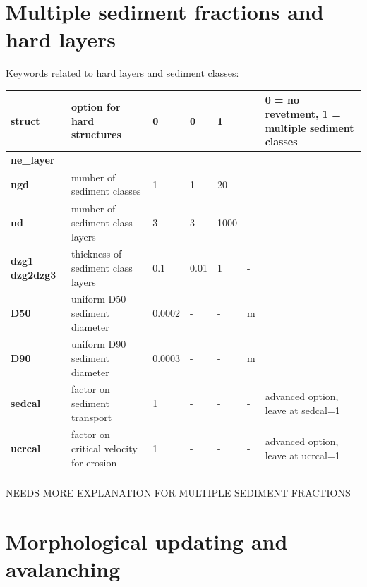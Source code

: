 \section{Multiple sediment fractions and hard layers}

Keywords related to hard layers and sediment classes:

\begin{tabular}{|p{0.6in}|p{0.9in}|p{0.5in}|p{0.5in}|p{0.4in}|p{0.4in}|p{0.7in}|} \hline 
\textbf{struct    } & option for hard structures & 0 & 0 & 1 &  & 0 = no revetment, 1 = multiple sediment classes \\ \hline 
\textbf{ne\_layer} &  &  &  &  &  &  \\ \hline 
\textbf{ngd       } & number of sediment classes & 1 & 1 & 20 & - &  \\ \hline 
\textbf{nd        } & number of sediment class layers & 3 & 3 & 1000 & - &  \\ \hline 
\textbf{dzg1      \newline dzg2\newline dzg3} & thickness of sediment class layers & 0.1 & 0.01 & 1 & - &  \\ \hline 
\textbf{D50} & uniform D50 sediment diameter & 0.0002 & - & - & m &  \\ \hline 
\textbf{D90} & uniform D90 sediment diameter & 0.0003 & - & - & m &  \\ \hline 
\textbf{sedcal} & factor on sediment transport & 1 & - & - & - & advanced option, leave at sedcal=1 \\ \hline 
\textbf{ucrcal} & factor on critical velocity for erosion & 1 & - & - & - & advanced option, leave at ucrcal=1 \\ \hline 
\textbf{} &  &  &  &  &  &  \\ \hline 
\end{tabular}

NEEDS MORE EXPLANATION FOR MULTIPLE SEDIMENT FRACTIONS


\section{Morphological updating and avalanching}

